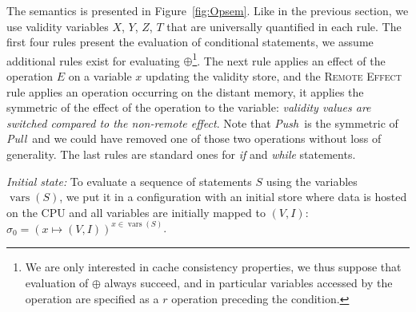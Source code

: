 \documentclass[preprint,12pt]{elsarticle}
\newcommand{\symb}[1]{\textit{#1}}
\newcommand{\Push}{\symb{Push}}
\newcommand{\Pull}{\symb{Pull}}
\DeclareMathOperator{\vars}{vars}
\begin{document}
The semantics is presented in Figure~\ref{fig:Opsem}. Like in the previous section, we 
use validity variables $X$, $Y$, $Z$, $T$ 
that are universally quantified in each rule.
 The first %
 four rules present the 
evaluation of conditional statements, we assume additional rules exist for evaluating 
$\oplus$\footnote{We are only interested in cache consistency properties, we thus suppose  that evaluation of $\oplus$ always succeed, and in particular  variables accessed by the operation are specified as a $r$ operation preceding the condition.}. The next rule applies an effect of the operation $E$ on a variable $x$ updating the validity store, 
and the \textsc{Remote Effect} rule applies an operation occurring on the distant memory, it 
applies the symmetric of the effect of the operation to the variable: \emph{validity values are switched compared to the non-remote effect}. Note that \Push\ is the symmetric of 
\Pull\ and we could have removed one of those two operations without loss of generality. 
The last rules are standard ones for \symb{if} and \symb{while} statements.

\noindent\emph{Initial state:} To evaluate a sequence of statements $S$ using the 
variables 
$\vars(S)$, we put it in a configuration with 
an initial 
store where data is hosted on the CPU and all variables are initially mapped to $(V,I)$: 
$\sigma_0=(x\mapsto 
(V,I))^{x\in \vars(S)}$.


\end{document}
